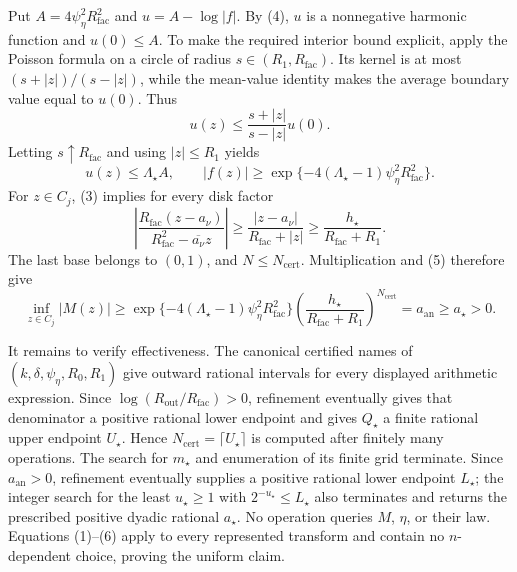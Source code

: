 Put \(A=4\psi_{\eta}^2R_{\mathrm{fac}}^2\) and \(u=A-\log|f|\).  By (4), \(u\) is a nonnegative harmonic function and \(u(0)\le A\).  To make the required interior bound explicit, apply the Poisson formula on a circle of radius \(s\in(R_1,R_{\mathrm{fac}})\).  Its kernel is at most \((s+|z|)/(s-|z|)\), while the mean-value identity makes the average boundary value equal to \(u(0)\).  Thus
\[
 u(z)\le\frac{s+|z|}{s-|z|}u(0).
\]
Letting \(s\uparrow R_{\mathrm{fac}}\) and using \(|z|\le R_1\) yields
\[
 u(z)\le\Lambda_{\star}A,
 \qquad
 |f(z)|\ge
 \exp\{-4(\Lambda_{\star}-1)\psi_{\eta}^2R_{\mathrm{fac}}^2\}. \tag{5}
\]
For \(z\in C_j\), (3) implies for every disk factor
\[
 \left|
 \frac{R_{\mathrm{fac}}(z-a_\nu)}
      {R_{\mathrm{fac}}^2-\overline{a_\nu}z}
 \right|
 \ge \frac{|z-a_\nu|}{R_{\mathrm{fac}}+|z|}
 \ge \frac{h_{\star}}{R_{\mathrm{fac}}+R_1}.
\]
The last base belongs to \((0,1)\), and \(N\le N_{\mathrm{cert}}\).  Multiplication and (5) therefore give
\[
 \inf_{z\in C_j}|M(z)|
 \ge
 \exp\{-4(\Lambda_{\star}-1)\psi_{\eta}^2R_{\mathrm{fac}}^2\}
 \left(\frac{h_{\star}}{R_{\mathrm{fac}}+R_1}\right)^{N_{\mathrm{cert}}}
 =a_{\mathrm{an}}
 \ge a_{\star}>0. \tag{6}
\]

It remains to verify effectiveness.  The canonical certified names of \((k,\delta,\psi_{\eta},R_0,R_1)\) give outward rational intervals for every displayed arithmetic expression.  Since \(\log(R_{\mathrm{out}}/R_{\mathrm{fac}})>0\), refinement eventually gives that denominator a positive rational lower endpoint and gives \(Q_{\star}\) a finite rational upper endpoint \(U_{\star}\).  Hence \(N_{\mathrm{cert}}=\lceil U_{\star}\rceil\) is computed after finitely many operations.  The search for \(m_{\star}\) and enumeration of its finite grid terminate.  Since \(a_{\mathrm{an}}>0\), refinement eventually supplies a positive rational lower endpoint \(L_{\star}\); the integer search for the least \(u_{\star}\ge1\) with \(2^{-u_{\star}}\le L_{\star}\) also terminates and returns the prescribed positive dyadic rational \(a_{\star}\).  No operation queries \(M\), \(\eta\), or their law.  Equations (1)--(6) apply to every represented transform and contain no \(n\)-dependent choice, proving the uniform claim.